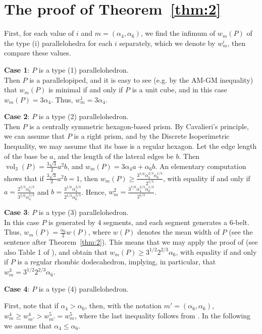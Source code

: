 \documentclass[twoside]{amsart}
\theoremstyle{definition}
\DeclareMathOperator{\vol}{vol}
\begin{document}
\section{The proof of Theorem~\ref{thm:2}}\label{sec:thm2}

First, for each value of $i$ and $m=(\alpha_4,\alpha_6)$, we find the infimum of $w_m(P)$ of the type (i) parallelohedra for each $i$ separately, which we denote by $w_m^i$, then compare these values.

\noindent
\textbf{Case 1}: $P$ is a type (1) parallelohedron.\\
Then $P$ is a parallelopiped, and it is easy to see (e.g. by the AM-GM inequality) that $w_m(P)$ is minimal if and only if $P$ is a unit cube, and in this case $w_m(P) = 3 \alpha_4$. Thus, $w_m^1 = 3 \alpha_4$.

\noindent
\textbf{Case 2}: $P$ is a type (2) parallelohedron.\\
Then $P$ is a centrally symmetric hexagon-based prism. By Cavalieri's principle, we can assume that $P$ is a right prism, and by the Discrete Isoperimetric Inequality, we may assume that its base is a regular hexagon. Let the edge length of the base be $a$, and the length of the lateral edges be $b$. Then $\vol_3(P) = \frac{3\sqrt{3}}{2}a^2 b$, and $w_m(P) = 3 \alpha_4 a + \alpha_6 b$. An elementary computation shows that if $\frac{3\sqrt{3}}{2}a^2 b = 1$, then $w_m(P) \geq \frac{3^{7/6} \alpha_4^{2/3} \alpha_6^{1/3}}{2^{1/3}}$, with equality if and only if $a= \frac{2^{2/3} \alpha_6^{1/3}}{3^{5/6} \alpha_4^{1/3}}$ and $b=\frac{3^{1/6} \alpha_4^{2/3}}{2^{1/3} \alpha_6^{2/3}}$. Hence, $w_m^2 = \frac{3^{7/6} \alpha_4^{2/3} \alpha_6^{1/3}}{2^{1/3}}$.

\noindent
\textbf{Case 3}: $P$ is a type (3) parallelohedron.\\
In this case $P$ is generated by $4$ segments, and each segment generates a $6$-belt. Thus, $w_m(P) = \frac{\alpha_6}{2} w(P)$, where $w(P)$ denotes the mean width of $P$ (see the sentence after Theorem~\ref{thm:2}). This means that we may apply the proof of \cite[Theorem 1]{Langi} (see also Table 1 of \cite{Langi}), and obtain that $w_m(P) \geq 3^{1/2} 2^{2/3} \alpha_6$, with equality if and only if $P$ is a regular rhombic dodecahedron, implying, in particular, that $w_m^3 = 3^{1/2} 2^{2/3} \alpha_6$.

\noindent
\textbf{Case 4}: $P$ is a type (4) parallelohedron.

First, note that if $\alpha_4 > \alpha_6$, then, with the notation $m'=(\alpha_6,\alpha_6)$, $w_m^4 \geq w_{m'}^4 > w_{m'}^5 = w_m^5$, where the last inequality follows from \cite[Theorem 1]{Langi}. In the following we assume that $\alpha_4 \leq \alpha_6$. 
\end{document}

